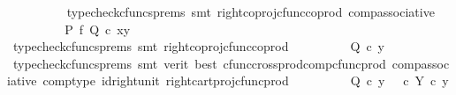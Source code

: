 \begin{isabellebody}
\ \ \ \ \ \ \ \ \isamarkupfalse%
\ {\isacharparenleft}{\kern0pt}typecheck{\isacharunderscore}{\kern0pt}cfuncs{\isacharunderscore}{\kern0pt}prems{\isacharcomma}{\kern0pt}\ smt\ right{\isacharunderscore}{\kern0pt}coproj{\isacharunderscore}{\kern0pt}cfunc{\isacharunderscore}{\kern0pt}coprod\ comp{\isacharunderscore}{\kern0pt}associative{}{\isacharparenright}{\kern0pt}\isanewline
\ \ \ \ \ \ \isamarkupfalse%
\ \isamarkupfalse%
\ {\isachardoublequoteopen}{\isacharparenleft}{\kern0pt}P\ {\isasymtimes}\isactrlsub f\ Q{\isacharparenright}{\kern0pt}\ {\isasymcirc}\isactrlsub c\ {\isasymlangle}x{\isacharcomma}{\kern0pt}y{\isasymrangle}\ {\isacharequal}{\kern0pt}\ {\isasymlangle}{\isasymf}{\isacharcomma}{\kern0pt}{\isasymt}{\isasymrangle}{\isachardoublequoteclose}\isanewline
\ \ \ \ \ \ \ \ \isamarkupfalse%
\ {\isacharparenleft}{\kern0pt}typecheck{\isacharunderscore}{\kern0pt}cfuncs{\isacharunderscore}{\kern0pt}prems{\isacharcomma}{\kern0pt}\ smt\ right{\isacharunderscore}{\kern0pt}coproj{\isacharunderscore}{\kern0pt}cfunc{\isacharunderscore}{\kern0pt}coprod{\isacharparenright}{\kern0pt}\isanewline
\ \ \ \ \ \ \isamarkupfalse%
\ \isamarkupfalse%
\ {\isachardoublequoteopen}Q\ {\isasymcirc}\isactrlsub c\ y\ {\isacharequal}{\kern0pt}\ {\isasymt}{\isachardoublequoteclose}\isanewline
\ \ \ \ \ \ \ \ \isamarkupfalse%
\ {\isacharparenleft}{\kern0pt}typecheck{\isacharunderscore}{\kern0pt}cfuncs{\isacharunderscore}{\kern0pt}prems{\isacharcomma}{\kern0pt}\ smt\ {\isacharparenleft}{\kern0pt}verit{\isacharcomma}{\kern0pt}\ best{\isacharparenright}{\kern0pt}\ cfunc{\isacharunderscore}{\kern0pt}cross{\isacharunderscore}{\kern0pt}prod{\isacharunderscore}{\kern0pt}comp{\isacharunderscore}{\kern0pt}cfunc{\isacharunderscore}{\kern0pt}prod\ comp{\isacharunderscore}{\kern0pt}associative{}\ comp{\isacharunderscore}{\kern0pt}type\ id{\isacharunderscore}{\kern0pt}right{\isacharunderscore}{\kern0pt}unit{}\ right{\isacharunderscore}{\kern0pt}cart{\isacharunderscore}{\kern0pt}proj{\isacharunderscore}{\kern0pt}cfunc{\isacharunderscore}{\kern0pt}prod{\isacharparenright}{\kern0pt}\isanewline
\ \ \ \ \ \ \isamarkupfalse%
\ \isamarkupfalse%
\ {\isachardoublequoteopen}Q\ {\isasymcirc}\isactrlsub c\ y\ {\isacharequal}{\kern0pt}\ {\isacharparenleft}{\kern0pt}{\isasymt}\ {\isasymcirc}\isactrlsub c\ {\isasymbeta}\isactrlbsub Y\isactrlesub {\isacharparenright}{\kern0pt}\ {\isasymcirc}\isactrlsub c\ y{\isachardoublequoteclose}\isanewline

\end{isabellebody}
